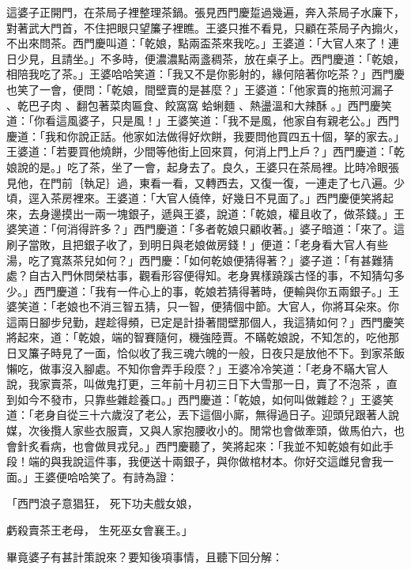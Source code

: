 \begin{showcontents}{}
這婆子正開門，在茶局子裡整理茶鍋。張見西門慶踅過幾遍，奔入茶局子水廉下，對著武大門首，不住把眼只望簾子裡瞧。王婆只推不看見，只顧在茶局子內搧火，不出來問茶。西門慶叫道：「乾娘，點兩盃茶來我吃。」王婆道：「大官人來了！連日少見，且請坐。」不多時，便濃濃點兩盞稠茶，放在桌子上。西門慶道：「乾娘，相陪我吃了茶。」王婆哈哈笑道：「我又不是你影射的，緣何陪著你吃茶？」西門慶也笑了一會，便問：「乾娘，間壁賣的是甚麼？」王婆道：「他家賣的拖煎河漏子 、乾巴子肉 、翻包著菜肉匾食、餃窩窩 蛤蜊麵 、熱盪溫和大辣酥 。」西門慶笑道：「你看這風婆子，只是風！」王婆笑道：「我不是風，他家自有親老公。」西門慶道：「我和你說正話。他家如法做得好炊餅，我要問他買四五十個，拏的家去。」王婆道：「若要買他燒餅，少間等他街上回來買，何消上門上戶？」西門慶道：「乾娘說的是。」吃了茶，坐了一會，起身去了。良久，王婆只在茶局裡。比時冷眼張見他，在門前｛執足｝過，東看一看，又轉西去，又復一復，一連走了七八遍。少頃，逕入茶房裡來。王婆道：「大官人僥倖，好幾日不見面了。」西門慶便笑將起來，去身邊摸出一兩一塊銀子，遞與王婆，說道：「乾娘，權且收了，做茶錢。」王婆笑道：「何消得許多？」西門慶道：「多者乾娘只顧收著。」婆子暗道：「來了。這刷子當敗，且把銀子收了，到明日與老娘做房錢！」便道：「老身看大官人有些湯，吃了寬蒸茶兒如何？」西門慶：「如何乾娘便猜得著？」婆子道：「有甚難猜處？自古入門休問榮枯事，觀看形容便得知。老身異樣蹺蹊古怪的事，不知猜勾多少。」西門慶道：「我有一件心上的事，乾娘若猜得著時，便輸與你五兩銀子。」王婆笑道：「老娘也不消三智五猜，只一智，便猜個中節。大官人，你將耳朵來。你這兩日腳步兒勤，趕趁得頻，已定是計掛著間壁那個人，我這猜如何？」西門慶笑將起來，道：「乾娘，端的智賽隨何，機強陸賈。不瞞乾娘說，不知怎的，吃他那日叉簾子時見了一面，恰似收了我三魂六魄的一般，日夜只是放他不下。到家茶飯懶吃，做事沒入腳處。不知你會弄手段麼？」王婆冷冷笑道：「老身不瞞大官人說，我家賣茶，叫做鬼打更，三年前十月初三日下大雪那一日，賣了不泡茶 ，直到如今不發市，只靠些雜趁養口。」西門慶道：「乾娘，如何叫做雜趁？」王婆笑道：「老身自從三十六歲沒了老公，丟下這個小廝，無得過日子。迎頭兒跟著人說媒，次後攬人家些衣服賣，又與人家抱腰收小的。閒常也會做牽頭，做馬伯六，也會針炙看病，也會做貝戎兒。」西門慶聽了，笑將起來：「我並不知乾娘有如此手段！端的與我說這件事，我便送十兩銀子，與你做棺材本。你好交這雌兒會我一面。」王婆便哈哈笑了。有詩為證：

「西門浪子意猖狂，  死下功夫戲女娘，

虧殺賣茶王老母，  生死巫女會襄王。」

畢竟婆子有甚計策說來？要知後項事情，且聽下回分解：


\end{showcontents}

